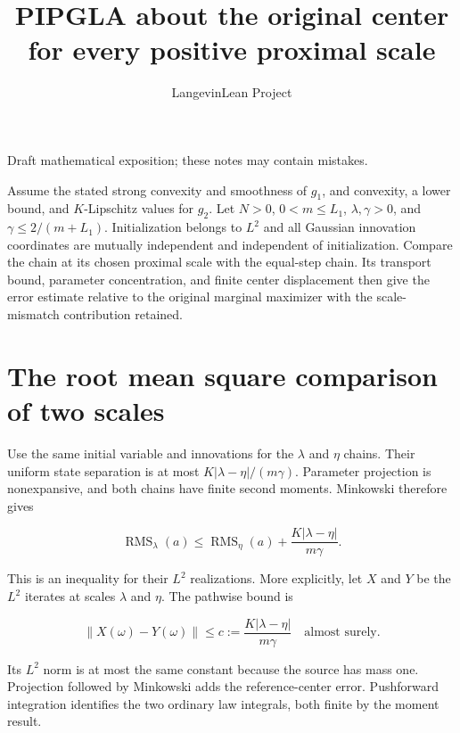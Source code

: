 \documentclass[11pt,a4paper]{article}
\title{\texorpdfstring{PIPGLA about the original center for every positive proximal scale}{PIPGLA about the original center for every positive proximal scale}}
\author{LangevinLean Project}
\date{}
\begin{document}
\maketitle
Draft mathematical exposition; these notes may contain mistakes.


Assume the stated strong convexity and smoothness of \(g_1\), and convexity, a lower bound, and \(K\)-Lipschitz values for \(g_2\). Let \(N>0\), \(0<m\le L_1\), \(\lambda,\gamma>0\), and \(\gamma\le2/(m+L_1)\). Initialization belongs to \(L^2\) and all Gaussian innovation coordinates are mutually independent and independent of initialization. Compare the chain at its chosen proximal scale with the equal-step chain. Its transport bound, parameter concentration, and finite center displacement then give the error estimate relative to the original marginal maximizer with the scale-mismatch contribution retained.


\section{\texorpdfstring{The root mean square comparison of two scales}{The root mean square comparison of two scales}}


Use the same initial variable and innovations for the \(\lambda\) and \(\eta\) chains. Their uniform state separation is at most \(K|\lambda-\eta|/(m\gamma)\). Parameter projection is nonexpansive, and both chains have finite second moments. Minkowski therefore gives

\[\operatorname{RMS}_\lambda(a)\le\operatorname{RMS}_\eta(a)+\frac{K|\lambda-\eta|}{m\gamma}.\]

This is an inequality for their \(L^2\) realizations. More explicitly, let \(X\) and \(Y\) be the \(L^2\) iterates at scales \(\lambda\) and \(\eta\). The pathwise bound is

\[\|X(\omega)-Y(\omega)\|\le c:=\frac{K|\lambda-\eta|}{m\gamma}\quad\text{almost surely}.\]

Its \(L^2\) norm is at most the same constant because the source has mass one. Projection followed by Minkowski adds the reference-center error. Pushforward integration identifies the two ordinary law integrals, both finite by the moment result.
\end{document}
